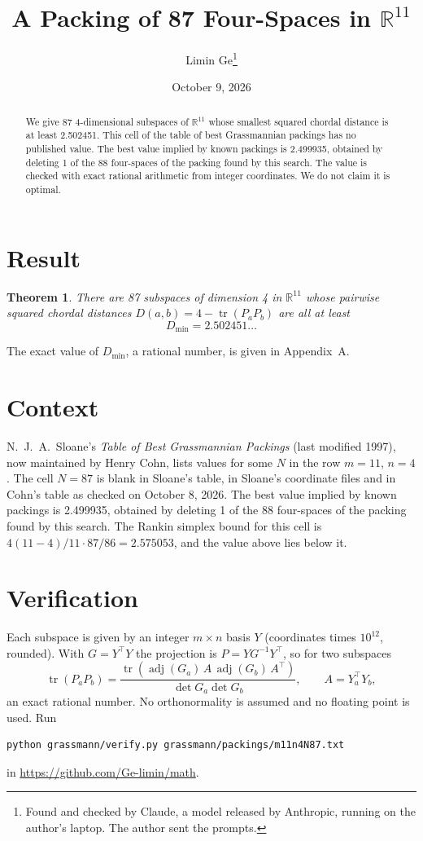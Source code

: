 \documentclass[11pt,a4paper]{article}
\title{A Packing of 87 Four-Spaces in $\mathbb{R}^{11}$}
\author{Limin Ge\thanks{Found and checked by Claude, a model released by Anthropic, running on the author's laptop. The author sent the prompts.}}
\date{October 9, 2026}
\newtheorem*{theorem}{Theorem}
\begin{document}
\maketitle
\begin{abstract}
We give 87 4-dimensional subspaces of $\mathbb{R}^{11}$ whose smallest squared chordal distance is at least 2.502451. This cell of the table of best Grassmannian packings has no published value. The best value implied by known packings is 2.499935, obtained by deleting 1 of the 88 four-spaces of the packing found by this search. The value is checked with exact rational arithmetic from integer coordinates. We do not claim it is optimal.
\end{abstract}

\section{Result}
\begin{theorem}
There are 87 subspaces of dimension 4 in $\mathbb{R}^{11}$ whose pairwise squared chordal distances $D(a,b) = 4 - \operatorname{tr}(P_aP_b)$ are all at least
\[ D_{\min} = 2.502451\ldots \]
\end{theorem}
The exact value of $D_{\min}$, a rational number, is given in Appendix~A.


\section{Context}
N.~J.~A.~Sloane's \emph{Table of Best Grassmannian Packings} (last modified 1997), now maintained by Henry Cohn, lists values for some $N$ in the row $m=11$, $n=4$. The cell $N=87$ is blank in Sloane's table, in Sloane's coordinate files and in Cohn's table as checked on October 8, 2026. The best value implied by known packings is 2.499935, obtained by deleting 1 of the 88 four-spaces of the packing found by this search. The Rankin simplex bound for this cell is $4(11-4)/11\cdot 87/86 = 2.575053$, and the value above lies below it.


\section{Verification}
Each subspace is given by an integer $m\times n$ basis $Y$ (coordinates times $10^{12}$, rounded). With $G=Y^\top Y$ the projection is $P=YG^{-1}Y^\top$, so for two subspaces
\[ \operatorname{tr}(P_aP_b)=\frac{\operatorname{tr}(\operatorname{adj}(G_a)\,A\,\operatorname{adj}(G_b)\,A^\top)}{\det G_a\det G_b},\qquad A=Y_a^\top Y_b, \]
an exact rational number. No orthonormality is assumed and no floating point is used. Run
\begin{verbatim}
python grassmann/verify.py grassmann/packings/m11n4N87.txt
\end{verbatim}
in \url{https://github.com/Ge-limin/math}.
\end{document}
